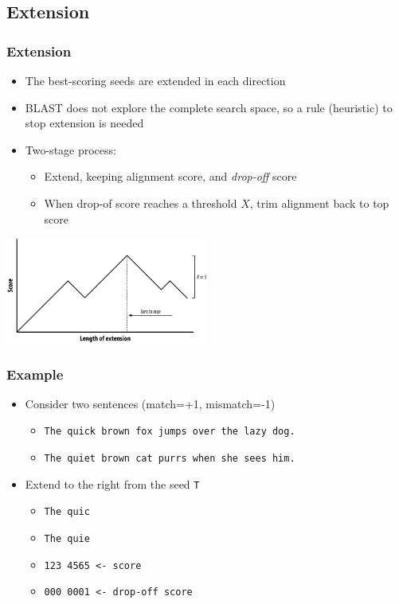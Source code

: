 \documentclass[table]{beamer}
\begin{document}
  \subsection{Extension}
  \begin{frame}
    \frametitle{Extension}
    \begin{itemize}
      \item The best-scoring seeds are extended in each direction
      \item BLAST does not explore the complete search space, so a rule (heuristic) to stop extension is needed
      \item Two-stage process:
      \begin{itemize}
        \item Extend, keeping alignment score, and \emph{drop-off} score
        \item When drop-of score reaches a threshold $X$, trim alignment back to top score
      \end{itemize}
    \end{itemize}
    \begin{center}
      \includegraphics[width=0.5\textwidth]{images/extension} 
    \end{center}    
  \end{frame}

  \begin{frame}
    \frametitle{Example}
    \begin{itemize}
      \item<1-> Consider two sentences (match=+1, mismatch=-1)
      \begin{itemize}
        \item \texttt{The quick brown fox jumps over the lazy dog.}
        \item \texttt{The quiet brown cat purrs when she sees him.}
      \end{itemize}
      \item<2-> Extend to the right from the seed \texttt{T}
      \begin{itemize}
        \item \texttt{The quic}
        \item \texttt{The quie}
        \item \texttt{123 4565 <- score}
        \item \texttt{000 0001 <- drop-off score}        
      \end{itemize}
    \end{itemize}
  \end{frame}
\end{document}
